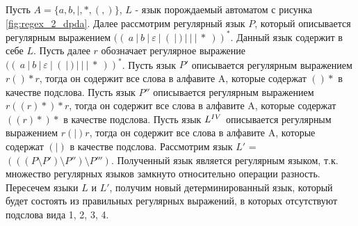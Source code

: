 \documentclass[a4paper, 14pt]{article}
\begin{document}
Пусть $A = \{a, b, |, *, (, )\}$, $L$ - язык порождаемый автоматом с рисунка \ref{fig:regex_2_dpda}. Далее рассмотрим регулярный язык $P$, который описывается регулярным выражением $((\ a \ | \ b \ | \ \varepsilon \ | \ ( \ | \ ) \ | \ \textbf{|} \ | \ * \ ))^*$. Данный язык содержит в себе $L$. Пусть далее $r$ обозначает регулярное выражение $((\ a \ | \ b \ | \ \varepsilon \ | \ ( \ | \ ) \ | \ \textbf{|} \ | \ * \ ))^*$.  Пусть язык $P'$ описывается регулярным выражением $r(){*}r$, тогда он содержит все слова в алфавите A, которые содержат $(){*}$ в качестве подслова. Пусть язык $P''$ описывается регулярным выражением $r((r){*}){*}r$, тогда он содержит все слова в алфавите A, которые содержат $((r){*}){*}$ в качестве подслова. Пусть язык $L^{\MakeUppercase{\romannumeral 4}}$ описывается регулярным выражением $r(|)r$, тогда он содержит все слова в алфавите A, которые содержат $(|)$ в качестве подслова. Рассмотрим язык $L'$ = $(((P \setminus P') \setminus P'') \setminus P''')$. Полученный язык является регулярным языком, т.к. множество регулярных языков замкнуто относительно операции разность. Пересечем языки $L$ и $L'$, получим новый детерминированный язык, который будет состоять из правильных регулярных выражений, в которых отсутствуют подслова вида 1, 2, 3, 4. 
\end{document}
